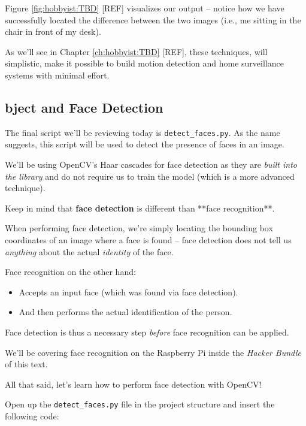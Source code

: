 Figure \ref{fig:hobbyist:TBD} [REF] visualizes our output -- notice how we have successfully located the difference between the two images (i.e., me sitting in the chair in front of my desk).

As we’ll see in Chapter \ref{ch:hobbyist:TBD} [REF], these techniques, will simplistic, make it possible to build motion detection and home surveillance systems with minimal effort.


\subsection{bject and Face Detection}

The final script we’ll be reviewing today is \texttt{detect_faces.py}. As the name suggests, this script will be used to detect the presence of faces in an image.

We’ll be using OpenCV’s Haar cascades for face detection as they are \textit{built into the library} and do not require us to train the model (which is a more advanced technique).

Keep in mind that \textbf{face detection} is different than **face recognition**.

When performing face detection, we’re simply locating the bounding box coordinates of an image where a face is found -- face detection does not tell us \textit{anything} about the actual \textit{identity} of the face.

Face recognition on the other hand:

\begin{itemize}
    \item Accepts an input face (which was found via face detection).
    \item And then performs the actual identification of the person.
\end{itemize}

Face detection is thus a necessary step \textit{before} face recognition can be applied.

We’ll be covering face recognition on the Raspberry Pi inside the \textit{Hacker Bundle} of this text.

All that said, let’s learn how to perform face detection with OpenCV!

Open up the \texttt{detect_faces.py} file in the project structure and insert the following code:

